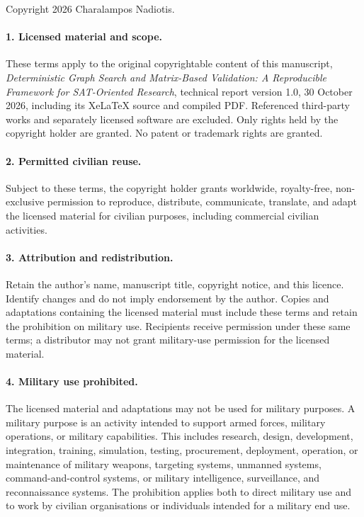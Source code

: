 Copyright 2026 Charalampos Nadiotis.

\paragraph{1. Licensed material and scope.}
These terms apply to the original copyrightable content of this manuscript,
\emph{Deterministic Graph Search and Matrix-Based Validation: A Reproducible Framework for SAT-Oriented Research},
technical report version 1.0, 30 October 2026, including its XeLaTeX source and compiled PDF.
Referenced third-party works and separately licensed software are excluded.
Only rights held by the copyright holder are granted. No patent or trademark rights are granted.

\paragraph{2. Permitted civilian reuse.}
Subject to these terms, the copyright holder grants worldwide, royalty-free,
non-exclusive permission to reproduce, distribute, communicate, translate, and
adapt the licensed material for civilian purposes, including commercial civilian activities.

\paragraph{3. Attribution and redistribution.}
Retain the author's name, manuscript title, copyright notice, and this licence.
Identify changes and do not imply endorsement by the author.
Copies and adaptations containing the licensed material must include these
terms and retain the prohibition on military use. Recipients receive permission
under these same terms; a distributor may not grant military-use permission for the licensed material.

\paragraph{4. Military use prohibited.}
The licensed material and adaptations may not be used for military purposes.
A military purpose is an activity intended to support armed forces, military
operations, or military capabilities. This includes research, design,
development, integration, training, simulation, testing, procurement, deployment,
operation, or maintenance of military weapons, targeting systems, unmanned
systems, command-and-control systems, or military intelligence, surveillance,
and reconnaissance systems. The prohibition applies both to direct military
use and to work by civilian organisations or individuals intended for a military end use.

